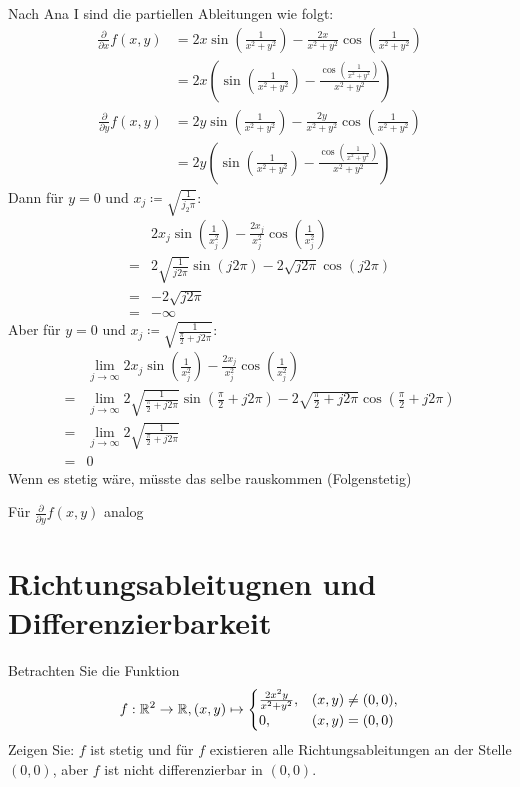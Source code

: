 \documentclass[sectionformat=aufgabe]{gadsescript}
\begin{document}
Nach Ana I sind die partiellen Ableitungen wie folgt:
\begin{align*}
	\frac{ \partial }{ \partial x } f(x, y) &= 2x \sin \left( \frac{ 1 }{ x^2 + y^2 }  \right) - \frac{ 2x }{ x^2 + y^2 } \cos \left( \frac{ 1 }{ x^2 + y^2 }  \right) \\
						&= 2x \left( \sin \left( \frac{ 1 }{ x^2 + y^2 } \right) - \frac{ \cos \left( \frac{ 1 }{ x^2 + y^2 }  \right) }{ x^2 + y^2 } \right)
\end{align*}
\begin{align*}
	\frac{ \partial }{ \partial y } f(x, y) &= 2y \sin \left( \frac{ 1 }{ x^2 + y^2 }  \right) - \frac{ 2y }{ x^2 + y^2 } \cos \left( \frac{ 1 }{ x^2 + y^2 }  \right) \\
						&= 2y \left( \sin \left( \frac{ 1 }{ x^2 + y^2 } \right) - \frac{ \cos \left( \frac{ 1 }{ x^2 + y^2 }  \right) }{ x^2 + y^2 } \right)
\end{align*}
Dann für $ y = 0 $ und $ x_j \coloneqq \sqrt{ \frac{ 1 }{ j_2 \pi  } }  $:
\begin{align*}
	~ & 2x_j \sin \left( \frac{ 1 }{ x_j^2 }  \right) - \frac{ 2x_j }{ x_j^2 } \cos \left( \frac{ 1 }{ x_j^2 }  \right) \\
	=& 2 \sqrt{ \frac{ 1 }{ j 2\pi } } \sin ( j 2\pi ) - 2 \sqrt{ j 2 \pi } \cos ( j 2\pi ) \\
	=& -2 \sqrt{j 2\pi } \\
	=& -\infty
\end{align*}
Aber für $ y = 0 $ und $ x_j \coloneqq \sqrt{ \frac{ 1 }{ \frac{ \pi }{ 2 } + j 2\pi  } } $:
\begin{align*}
	&\lim_{j \to \infty} 2x_j \sin \left( \frac{ 1 }{ x_j^2 }  \right) - \frac{ 2x_j }{ x_j^2 } \cos \left( \frac{ 1 }{ x_j^2 }  \right)\\
	=& \lim_{j \to \infty} 2 \sqrt{ \frac{ 1 }{ \frac{ \pi }{ 2 } + j 2\pi } } \sin ( \frac{ \pi }{ 2 } + j 2\pi ) - 2 \sqrt{ \frac{ \pi }{ 2 } + j 2\pi } \cos ( \frac{ \pi }{ 2 } + j 2\pi ) \\
	= & \lim_{j \to \infty} 2 \sqrt{ \frac{ 1 }{ \frac{ \pi }{ 2 } + j 2\pi  }  } \\
	= & 0
\end{align*}
Wenn es stetig wäre, müsste das selbe rauskommen (Folgenstetig)

Für $ \frac{ \partial }{ \partial y } f(x, y) $ analog


\section{Richtungsableitugnen und Differenzierbarkeit}
Betrachten Sie die Funktion
\[
	f: \mathbb{R} ^2 \to \mathbb{R} , (x, y) \mapsto \begin{cases}
		\frac{ 2 x^2 y }{ x^2 + y^2 } , & (x, y) \neq (0, 0),\\
		0, & (x, y) = (0, 0)
	\end{cases}
\]
Zeigen Sie: $ f $ ist stetig und für $ f $ existieren alle Richtungsableitungen an der Stelle $ (0, 0) $, aber $ f $ ist nicht differenzierbar in $ (0, 0) $.
\end{document}
